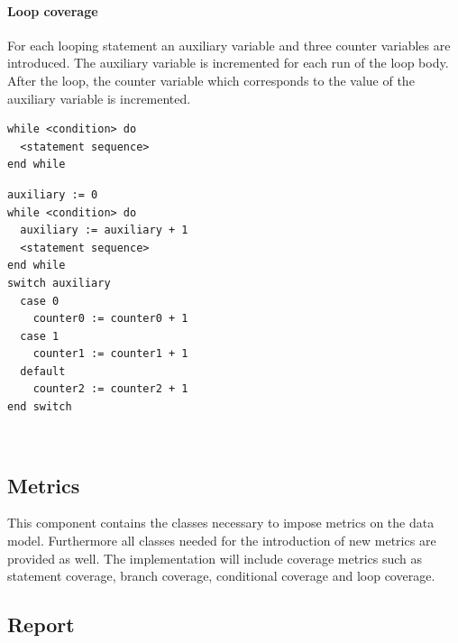 \paragraph{Loop coverage}
For each looping statement an auxiliary variable and three counter variables are introduced. The auxiliary variable is incremented for each run of the loop body. After the loop, the counter variable which corresponds to the value of the auxiliary variable is incremented.
\newline\\
\begin{minipage}[t]{0.5\textwidth}
\begin{verbatim}
while <condition> do
  <statement sequence>
end while
\end{verbatim}
\end{minipage}
\begin{minipage}[t]{0.5\textwidth}
\begin{verbatim}
auxiliary := 0
while <condition> do
  auxiliary := auxiliary + 1
  <statement sequence>
end while
switch auxiliary
  case 0 
    counter0 := counter0 + 1
  case 1 
    counter1 := counter1 + 1
  default
    counter2 := counter2 + 1
end switch
\end{verbatim}
\end{minipage}
\newline\\

\subsection{Metrics} \label{Components:Metrics}
This component contains the classes necessary to impose metrics on the data model. Furthermore all classes needed for the introduction of new metrics are provided as well. The implementation will include coverage metrics such as statement coverage, branch coverage, conditional coverage and loop coverage.

\subsection{Report}

